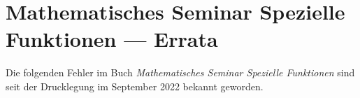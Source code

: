 \documentclass{article}
\begin{document}
\def\fehler#1#2{
\bgroup\parindent0pt
\rule[0mm]{\textwidth}{0.5pt}
\hbox to\hsize{%
#1
\hfill
#2}
\rule[2mm]{\textwidth}{0.5pt}
\egroup
}

\def\korrektur#1{
\vspace{5mm}
\parindent0pt
Korrektur-Diff:\\
\small

}

\section*{Mathematisches Seminar Spezielle Funktionen --- Errata}

Die folgenden Fehler im Buch {\em Mathematisches Seminar Spezielle Funktionen}
sind seit der Drucklegung im September 2022 bekannt geworden.

\vspace*{1cm}


%
\end{document}
